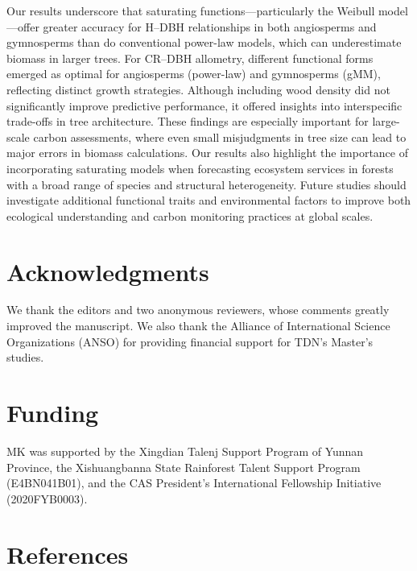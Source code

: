 \documentclass[
  12pt,
  letterpaper,
  DIV=11,
  numbers=noendperiod]{scrartcl}
\begin{document}
Our results underscore that saturating functions---particularly the
Weibull model---offer greater accuracy for H--DBH relationships in both
angiosperms and gymnosperms than do conventional power-law models, which
can underestimate biomass in larger trees. For CR--DBH allometry,
different functional forms emerged as optimal for angiosperms
(power-law) and gymnosperms (gMM), reflecting distinct growth
strategies. Although including wood density did not significantly
improve predictive performance, it offered insights into interspecific
trade-offs in tree architecture. These findings are especially important
for large-scale carbon assessments, where even small misjudgments in
tree size can lead to major errors in biomass calculations. Our results
also highlight the importance of incorporating saturating models when
forecasting ecosystem services in forests with a broad range of species
and structural heterogeneity. Future studies should investigate
additional functional traits and environmental factors to improve both
ecological understanding and carbon monitoring practices at global
scales.

\newpage

\hypertarget{acknowledgments}{%
\section*{Acknowledgments}\label{acknowledgments}}

We thank the editors and two anonymous reviewers, whose comments greatly
improved the manuscript. We also thank the Alliance of International
Science Organizations (ANSO) for providing financial support for TDN's
Master's studies.

\hypertarget{funding}{%
\section*{Funding}\label{funding}}

MK was supported by the Xingdian Talenj Support Program of Yunnan
Province, the Xishuangbanna State Rainforest Talent Support Program
(E4BN041B01), and the CAS President's International Fellowship
Initiative (2020FYB0003).

\newpage

\hypertarget{references}{%
\section*{References}\label{references}}
\end{document}
